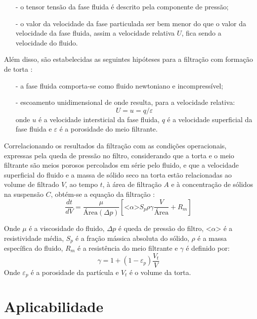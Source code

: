 \begin{itemize}
\item[-] o tensor tensão da fase fluida é descrito pela componente de pressão;
\item[-] o valor da velocidade da fase particulada ser bem menor do que o valor
  da velocidade da fase fluida, assim a velocidade relativa $U$, fica sendo a
  velocidade do fluido.
\end{itemize}

Além disso, são estabelecidas as seguintes hipóteses para a filtração com formação de
torta : 
\begin{itemize}
\item[-] a fase fluida comporta-se como fluido newtoniano e incompressível; 
\item[-] escoamento unidimensional de onde resulta, para a velocidade relativa:
  $$U = u = q/\varepsilon$$
  onde $u$ é a velocidade intersticial da fase fluida, $q$ é a velocidade
  superficial da fase fluida e $\varepsilon$ é a porosidade do meio filtrante.
\end{itemize}

Correlacionando os resultados da filtração com as condições operacionais,
expressas pela queda de pressão no filtro, considerando que a torta e o meio
filtrante são meios porosos percolados em série pelo fluido, e que a velocidade
superficial do fluido e a massa de sólido seco na torta estão relacionadas ao
volume de filtrado $V$, ao tempo $t$, à área de filtração $A$ e à concentração de
sólidos na suspensão $C$, obtém-se a equação da filtração
:
\newcommand{\lalphal}{\textrm{<}\alpha\textrm{>}}
\begin{equation}
  \label{eq:filtracao}
  \frac{dt}{dV} = \frac{\mu}{\textrm{Área}(\Delta p)} \left[\lalphal{} S_p \rho \gamma \frac{V}{\textrm{Área}} + R_m\right]
\end{equation}

Onde $\mu$ é a viscosidade do fluido, $\Delta p$ é queda de pressão do filtro,
$\lalphal{}$ é a resistividade média, $S_p$ é a fração mássica absoluta do
sólido, $\rho$ é a massa específica do fluido, $R_m$ é a resistência do meio
filtrante e $\gamma$ é definido por:
\begin{equation}
  \gamma = 1 + (1 - \varepsilon_p) \frac{V_t}{V}
\end{equation}
Onde $\varepsilon_p$ é a porosidade da partícula e $V_t$ é o volume da torta.


\section{Aplicabilidade}\label{sec:aplicabilidade}

